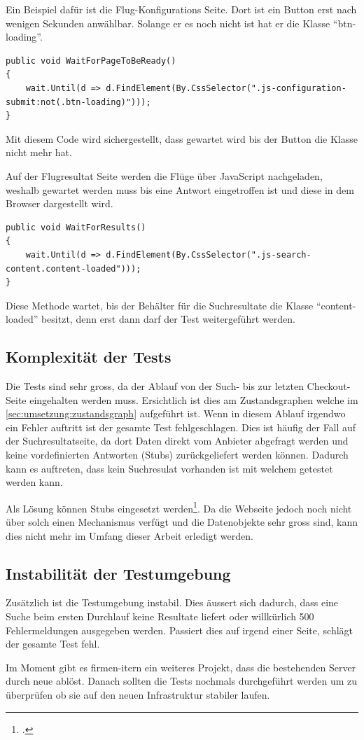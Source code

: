 Ein Beispiel dafür ist die Flug-Konfigurations Seite. Dort ist ein Button erst nach wenigen Sekunden anwählbar.
Solange er es noch nicht ist hat er die Klasse "`btn-loading"'. 

\lstset{language=csh}
\begin{lstlisting}
public void WaitForPageToBeReady()
{
    wait.Until(d => d.FindElement(By.CssSelector(".js-configuration-submit:not(.btn-loading)")));
}
\end{lstlisting}

Mit diesem Code wird sichergestellt, dass gewartet wird bis der Button die Klasse nicht mehr hat.

Auf der Flugresultat Seite werden die Flüge über JavaScript nachgeladen, weshalb gewartet werden muss bis eine Antwort eingetroffen ist und diese in dem Browser dargestellt wird.

\begin{lstlisting}
public void WaitForResults()
{
    wait.Until(d => d.FindElement(By.CssSelector(".js-search-content.content-loaded")));
}
\end{lstlisting}

Diese Methode wartet, bis der Behälter für die Suchresultate die Klasse "`content-loaded"' besitzt, denn erst dann darf der Test weitergeführt werden.

\subsection{Komplexität der Tests}
\label{sec:umsetzung:probleme:komplexität}
Die Tests sind sehr gross, da der Ablauf von der Such- bis zur letzten Checkout-Seite eingehalten werden muss. Ersichtlich ist dies am Zustandsgraphen welche im \cref{sec:umsetzung:zustandsgraph}  aufgeführt ist. Wenn in diesem Ablauf irgendwo ein Fehler auftritt ist der gesamte Test fehlgeschlagen. Dies ist häufig der Fall auf der Suchresultatseite, da dort Daten direkt vom Anbieter abgefragt werden und keine vordefinierten Antworten (Stubs) zurückgeliefert werden können. Dadurch kann es auftreten, dass kein Suchresulat vorhanden ist mit welchem getestet werden kann.

Als Lösung können Stubs eingesetzt werden\footcite{Stubs}. Da die Webseite jedoch noch nicht über solch einen Mechanismus verfügt und die Datenobjekte sehr gross sind, kann dies nicht mehr im Umfang dieser Arbeit erledigt werden.

\subsection{Instabilität der Testumgebung}
\label{sec:umsetzung:probleme:stabilität}
Zusätzlich ist die Testumgebung instabil. Dies äussert sich dadurch, dass eine Suche beim ersten Durchlauf keine Resultate liefert oder willkürlich 500 Fehlermeldungen ausgegeben werden. Passiert dies auf irgend einer Seite, schlägt der gesamte Test fehl. 

Im Moment gibt es firmen-itern ein weiteres Projekt, dass die bestehenden Server durch neue ablöst. Danach sollten die Tests nochmals durchgeführt werden um zu überprüfen ob sie auf den neuen Infrastruktur stabiler laufen.